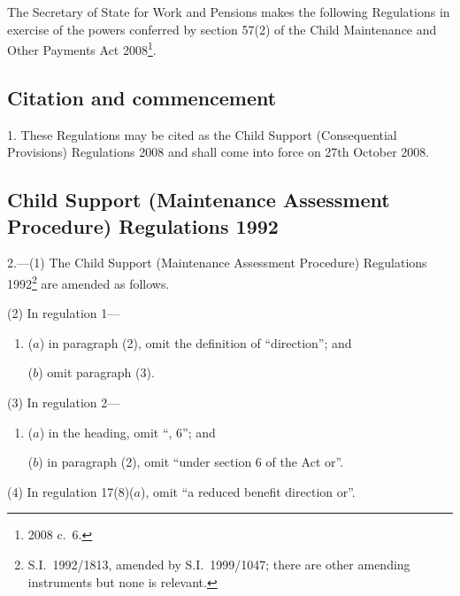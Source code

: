 \documentclass[12pt,a4paper]{article}
\title{\regstitle}
\author{S.I.\ 2008 No.\ 2543}
\date{Made
26th September 2008\\
Laid before Parliament
1st October 2008\\
Coming into force
27th October 2008
}
\begin{document}
\maketitle

\noindent
The Secretary of State for Work and Pensions makes the following Regulations in exercise of the powers conferred by section 57(2) of the Child Maintenance and Other Payments Act 2008\footnote{2008 c.~6.}. 

{\sloppy

\tableofcontents

}

\bigskip

\setcounter{secnumdepth}{-2}

\subsection[1. Citation and commencement]{Citation and commencement}

1.  These Regulations may be cited as the Child Support (Consequential Provisions) Regulations 2008 and shall come into force on 27th October 2008.

\subsection[2. Child Support (Maintenance Assessment Procedure) Regulations 1992]{\sloppy Child Support (Maintenance Assessment Procedure) Regulations 1992}

2.---(1)  The Child Support (Maintenance Assessment Procedure) Regulations 1992\footnote{S.I.~1992/1813, amended by S.I.~1999/1047; there are other amending instruments but none is relevant.} are amended as follows.

(2) In regulation 1—
\begin{enumerate}\item[]
($a$) in paragraph (2), omit the definition of “direction”; and

($b$) omit paragraph (3).
\end{enumerate}

(3) In regulation 2—
\begin{enumerate}\item[]
($a$) in the heading, omit “, 6”; and

($b$) in paragraph (2), omit “under section 6 of the Act or”.
\end{enumerate}

(4) In regulation 17(8)($a$), omit “a reduced benefit direction or”.
\end{document}
